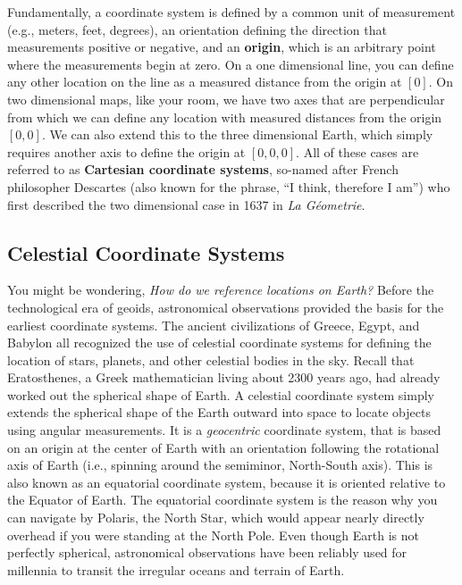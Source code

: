 \documentclass[
]{book}
\begin{document}
Fundamentally, a coordinate system is defined by a common unit of measurement (e.g., meters, feet, degrees), an orientation defining the direction that measurements positive or negative, and an \textbf{origin}, which is an arbitrary point where the measurements begin at zero. On a one dimensional line, you can define any other location on the line as a measured distance from the origin at \([0]\). On two dimensional maps, like your room, we have two axes that are perpendicular from which we can define any location with measured distances from the origin \([0,0]\). We can also extend this to the three dimensional Earth, which simply requires another axis to define the origin at \([0,0,0]\). All of these cases are referred to as \textbf{Cartesian coordinate systems}, so-named after French philosopher Descartes (also known for the phrase, ``I think, therefore I am'') who first described the two dimensional case in 1637 in \emph{La Géometrie}.

\subsection{Celestial Coordinate Systems}\label{celestial-coordinate-systems}

You might be wondering, \emph{How do we reference locations on Earth?} Before the technological era of geoids, astronomical observations provided the basis for the earliest coordinate systems. The ancient civilizations of Greece, Egypt, and Babylon all recognized the use of celestial coordinate systems for defining the location of stars, planets, and other celestial bodies in the sky. Recall that Eratosthenes, a Greek mathematician living about 2300 years ago, had already worked out the spherical shape of Earth. A celestial coordinate system simply extends the spherical shape of the Earth outward into space to locate objects using angular measurements. It is a \emph{geocentric} coordinate system, that is based on an origin at the center of Earth with an orientation following the rotational axis of Earth (i.e., spinning around the semiminor, North-South axis). This is also known as an equatorial coordinate system, because it is oriented relative to the Equator of Earth. The equatorial coordinate system is the reason why you can navigate by Polaris, the North Star, which would appear nearly directly overhead if you were standing at the North Pole. Even though Earth is not perfectly spherical, astronomical observations have been reliably used for millennia to transit the irregular oceans and terrain of Earth.
\end{document}

